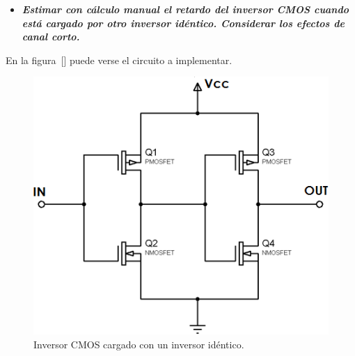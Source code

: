 

\begin{itemize}
\item \emph{\textbf{Estimar con cálculo manual el retardo del inversor CMOS cuando está cargado por otro inversor idéntico. Considerar los efectos de canal corto.}}
\end{itemize}

En la figura~[] puede verse el circuito a implementar.


\begin{figure}[H] %
\begin{center}
\includegraphics[width=0.93 \textwidth, angle=90]{./img/point1/inverter_loaded_with_inverter}
\caption{\label{fig:fig_inverter_loaded_with_inverter}\footnotesize{Inversor CMOS cargado con un inversor idéntico.}}
\end{center}
\end{figure}





\vfill



